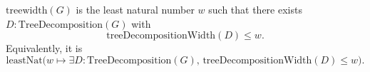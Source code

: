 \(\mathrm{treewidth}(G)\) is the least natural number \(w\) such that
there exists \(D:\mathrm{TreeDecomposition}(G)\) with
\[
  \mathrm{treeDecompositionWidth}(D)\le w.
\]
Equivalently, it is
\[
  \mathrm{leastNat}\bigl(w\mapsto
    \exists D:\mathrm{TreeDecomposition}(G),\,
      \mathrm{treeDecompositionWidth}(D)\le w\bigr).
\]
